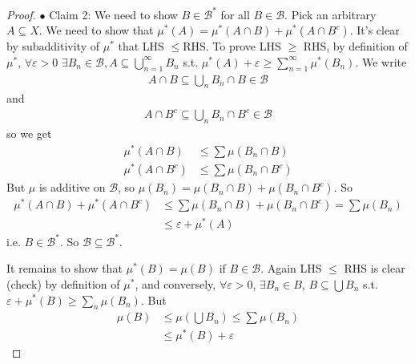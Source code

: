\documentclass[a4paper]{article}
\begin{document}
\begin{thm}
\begin{proof}
$\bullet$ Claim 2: We need to show $B \in \mathcal{B}^*$ for all $B \in \mathcal{B}$. Pick an arbitrary $A \subseteq X$. We need to show that $\mu^*(A) = \mu^* (A \cap B) + \mu^*(A \cap B^c)$. It's clear by subadditivity of $\mu^*$ that LHS $\leq $RHS. To prove LHS $\geq$ RHS, by definition of $\mu^*$, $\forall \varepsilon>0$ $\exists B_n \in \mathcal{B}, A\subseteq \bigcup_{n=1}^\infty B_n$ s.t. $\mu^*(A)+\varepsilon\geq\sum_{n=1}^\infty \mu^*(B_n)$. We write
\begin{equation*}
\begin{aligned}
A \cap B \subseteq \bigcup_n B_n \cap B \in \mathcal{B}
\end{aligned}
\end{equation*}
and
\begin{equation*}
\begin{aligned}
A \cap B^c \subseteq \bigcup_n B_n \cap B^c \in \mathcal{B}
\end{aligned}
\end{equation*}
so we get
\begin{equation*}
\begin{aligned}
\mu^*(A \cap B) &\leq \sum \mu(B_n \cap B)\\
\mu^*(A \cap B^c) &\leq \sum \mu(B_n \cap B^c)
\end{aligned}
\end{equation*}
But $\mu$ is additive on $\mathcal{B}$, so $\mu(B_n) = \mu(B_n \cap B) + \mu(B_n \cap B^c)$. So
\begin{equation*}
\begin{aligned}
\mu^*(A \cap B) + \mu^*(A \cap B^c) &\leq \sum \mu(B_n \cap B) + \mu(B_n \cap B^c) = \sum \mu(B_n)\\
&\leq \varepsilon+\mu^*(A)
\end{aligned}
\end{equation*}
i.e. $B \in \mathcal{B}^*$. So $\mathcal{B} \subseteq \mathcal{B}^*$.

It remains to show that $\mu^*(B) = \mu(B)$ if $B \in \mathcal{B}$. Again LHS $\leq$ RHS is clear (check) by definition of $\mu^*$, and conversely, $\forall \varepsilon>0$, $\exists B_n \in B$, $B \subseteq \bigcup B_n$ s.t. $\varepsilon+\mu^*(B) \geq \sum_n \mu(B_n)$. But
\begin{equation*}
\begin{aligned}
\mu(B) &\leq \mu(\bigcup B_n) \leq \sum \mu(B_n)\\
&\leq \mu^*(B) + \varepsilon
\end{aligned}
\end{equation*}


\end{proof}
\end{thm}
\end{document}
